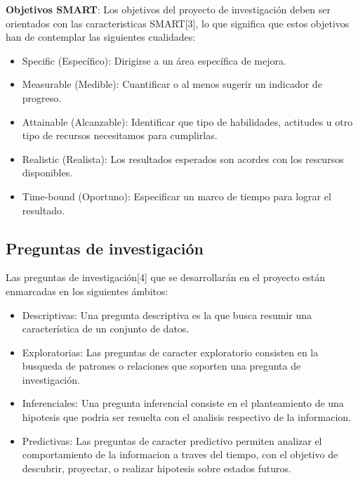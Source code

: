    \textbf{Objetivos SMART}: Los objetivos del proyecto de investigación deben ser orientados con las caracteristicas SMART[3], lo que significa que estos objetivos han de contemplar las siguientes cualidades:%
   \begin{itemize}
     \item Specific  (Específico): Dirigirse a un área específica de mejora.%
     \item Measurable (Medible): Cuantificar o al menos sugerir un indicador de progreso.%
     \item Attainable (Alcanzable): Identificar que tipo de habilidades, actitudes u otro tipo de recursos necesitamos para cumplirlas.%
     \item Realistic (Realista): Los resultados esperados son acordes con los rescursos disponibles.%
     \item Time-bound (Oportuno): Especificar un marco de tiempo para lograr el resultado.%
	\end{itemize}

  \subsection{Preguntas de investigación}
  Las preguntas de investigación[4] que se desarrollarán en el proyecto están enmarcadas en los siguientes ámbitos:
  \begin{itemize}
   \item Descriptivas: Una pregunta descriptiva es la que busca resumir una característica de un conjunto de datos.
   \item Exploratorias: Las preguntas de caracter exploratorio consisten en la busqueda de patrones o relaciones que soporten una pregunta de investigación.
   \item Inferenciales: Una pregunta inferencial consiste en el planteamiento de una hipotesis que podria ser resuelta con el analisis respectivo de la informacion.
   \item Predictivas: Las preguntas de caracter predictivo permiten analizar el comportamiento de la informacion a traves del tiempo, con el objetivo de descubrir, proyectar, o realizar hipotesis sobre estados futuros.
  \end{itemize}
  
